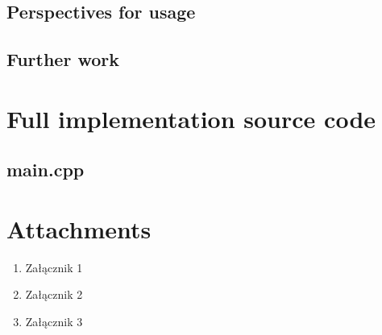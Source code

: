 \documentclass[12pt]{report}
\begin{document}
\section{Perspectives for usage }



\section{Further work}

 
\chapter{Full implementation source code} \label{rozdzial.kod}
\section{main.cpp}

\pagebreak 



\printbibliography[heading=bibintoc]

\listoffigures

\listoftables

\chapter*{Attachments}
\begin{enumerate}
\item Załącznik 1
\item Załącznik 2
\item Załącznik 3
\end{enumerate}
\end{document}

